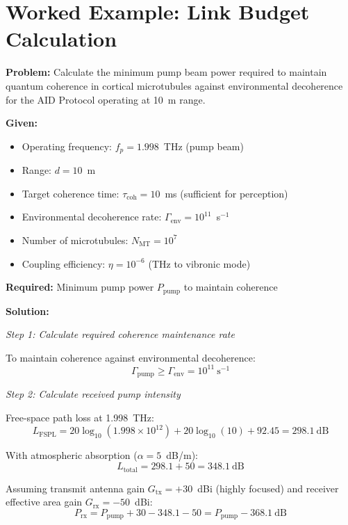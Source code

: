 \section{Worked Example: Link Budget Calculation}

\textbf{Problem:} Calculate the minimum pump beam power required to maintain quantum coherence in cortical microtubules against environmental decoherence for the AID Protocol operating at 10~m range.

\textbf{Given:}
\begin{itemize}
\item Operating frequency: $f_p = 1.998$~THz (pump beam)
\item Range: $d = 10$~m
\item Target coherence time: $\tau_{\text{coh}} = 10$~ms (sufficient for perception)
\item Environmental decoherence rate: $\Gamma_{\text{env}} = 10^{11}$~s$^{-1}$
\item Number of microtubules: $N_{\text{MT}} = 10^7$
\item Coupling efficiency: $\eta = 10^{-6}$ (THz to vibronic mode)
\end{itemize}

\textbf{Required:} Minimum pump power $P_{\text{pump}}$ to maintain coherence

\textbf{Solution:}

\textit{Step 1: Calculate required coherence maintenance rate}

To maintain coherence against environmental decoherence:
\begin{equation}
\Gamma_{\text{pump}} \geq \Gamma_{\text{env}} = 10^{11}~\text{s}^{-1}
\end{equation}

\textit{Step 2: Calculate received pump intensity}

Free-space path loss at 1.998~THz:
\begin{equation}
L_{\text{FSPL}} = 20\log_{10}(1.998 \times 10^{12}) + 20\log_{10}(10) + 92.45 = 298.1~\text{dB}
\end{equation}

With atmospheric absorption ($\alpha = 5$~dB/m):
\begin{equation}
L_{\text{total}} = 298.1 + 50 = 348.1~\text{dB}
\end{equation}

Assuming transmit antenna gain $G_{\text{tx}} = +30$~dBi (highly focused) and receiver effective area gain $G_{\text{rx}} = -50$~dBi:
\begin{equation}
P_{\text{rx}} = P_{\text{pump}} + 30 - 348.1 - 50 = P_{\text{pump}} - 368.1~\text{dB}
\end{equation}


